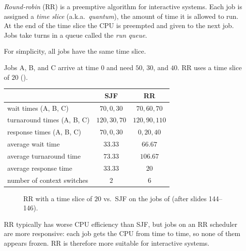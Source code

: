 \begin{definition}
  \emph{Round-robin} (RR) is a preemptive algorithm for interactive systems. Each job is assigned a \emph{time slice} (a.k.a.\ \emph{quantum}), the amount of time it is allowed to run. At the end of the time slice the CPU is preempted and given to the next job. Jobs take turns in a queue called the \emph{run queue}.
\end{definition}

For simplicity, all jobs have the same time slice.

\begin{example}[RR vs.\ SJF]
  \label{ex:rr}
  Jobs A, B, and C arrive at time $0$ and need $50$, $30$, and $40$. RR uses a time slice of $20$ ().
  \begin{center}
  \begin{tabular}{lcc}
    \toprule
     & SJF & RR \\
    \midrule
    wait times (A, B, C) & $70, 0, 30$ & $70, 60, 70$ \\
    turnaround times (A, B, C) & $120, 30, 70$ & $120, 90, 110$ \\
    response times (A, B, C) & $70, 0, 30$ & $0, 20, 40$ \\
    \midrule
    average wait time & $33.33$ & $66.67$ \\
    average turnaround time & $73.33$ & $106.67$ \\
    average response time & $33.33$ & $20$ \\
    number of context switches & $2$ & $6$ \\
    \bottomrule
  \end{tabular}
  \end{center}
\end{example}

\begin{figure}[htbp]
\centering
{}
\caption{RR with a time slice of $20$ vs.\ SJF on the jobs of  (after slides 144--146).}
\label{fig:rr}
\end{figure}

RR typically has worse CPU efficiency than SJF, but jobs on an RR scheduler are more responsive: each job gets the CPU from time to time, so none of them appears frozen. RR is therefore more suitable for interactive systems.


